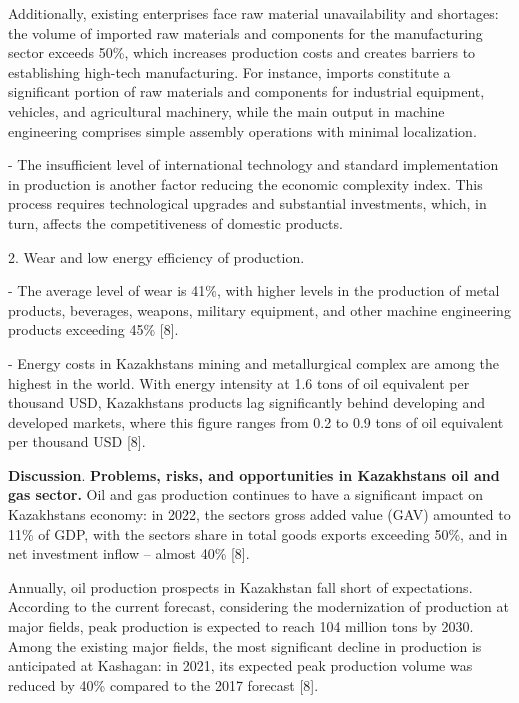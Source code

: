 Additionally, existing enterprises face raw material unavailability and
shortages: the volume of imported raw materials and components for the
manufacturing sector exceeds 50\%, which increases production costs and
creates barriers to establishing high-tech manufacturing. For instance,
imports constitute a significant portion of raw materials and components
for industrial equipment, vehicles, and agricultural machinery, while
the main output in machine engineering comprises simple assembly
operations with minimal localization.

- The insufficient level of international technology and standard
implementation in production is another factor reducing the economic
complexity index. This process requires technological upgrades and
substantial investments, which, in turn, affects the competitiveness of
domestic products.

2. Wear and low energy efficiency of production.

- The average level of wear is 41\%, with higher levels in the
production of metal products, beverages, weapons, military equipment,
and other machine engineering products exceeding 45\% {[}8{]}.

- Energy costs in Kazakhstan\textquotesingle s mining and metallurgical
complex are among the highest in the world. With energy intensity at 1.6
tons of oil equivalent per thousand USD, Kazakhstan\textquotesingle s
products lag significantly behind developing and developed markets,
where this figure ranges from 0.2 to 0.9 tons of oil equivalent per
thousand USD {[}8{]}.

{\bfseries Discussion}. {\bfseries Problems, risks, and opportunities in
Kazakhstan\textquotesingle s oil and gas sector.} Oil and gas production
continues to have a significant impact on Kazakhstan\textquotesingle s
economy: in 2022, the sector\textquotesingle s gross added value (GAV)
amounted to 11\% of GDP, with the sector\textquotesingle s share in
total goods exports exceeding 50\%, and in net investment inflow --
almost 40\% {[}8{]}.

Annually, oil production prospects in Kazakhstan fall short of
expectations. According to the current forecast, considering the
modernization of production at major fields, peak production is expected
to reach 104 million tons by 2030. Among the existing major fields, the
most significant decline in production is anticipated at Kashagan: in
2021, its expected peak production volume was reduced by 40\% compared
to the 2017 forecast {[}8{]}.

